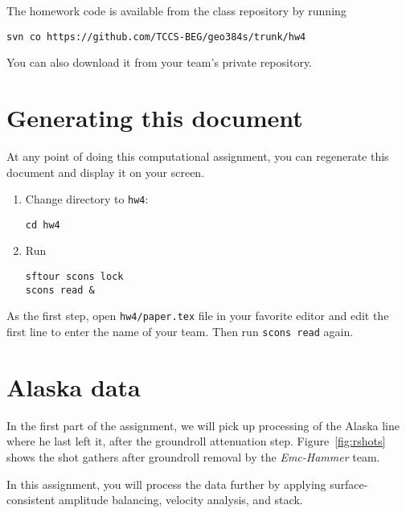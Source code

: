 The homework code is available from the class repository
by running
\begin{verbatim}
svn co https://github.com/TCCS-BEG/geo384s/trunk/hw4
\end{verbatim}
You can also download it from your team's private repository.

\section{Generating this document}

At any point of doing this computational assignment, you can
regenerate this document and display it on your screen.

\begin{enumerate}          
\item Change directory to \texttt{hw4}:
\begin{verbatim}
cd hw4
\end{verbatim}
\item Run
\begin{verbatim}
sftour scons lock
scons read &
\end{verbatim}
\end{enumerate}

As the first step, open \texttt{hw4/paper.tex} file in your favorite
editor and edit the first line to enter the name of your team. Then
run \texttt{scons read} again.

\section{Alaska data}

In the first part of the assignment, we will pick up processing of the
Alaska line where he last left it, after the groundroll attenuation
step. Figure~\ref{fig:rshots} shows the shot gathers after groundroll
removal by the \emph{Emc-Hammer} team.


In this assignment, you will process the data further by applying
surface-consistent amplitude balancing, velocity analysis, and stack.

